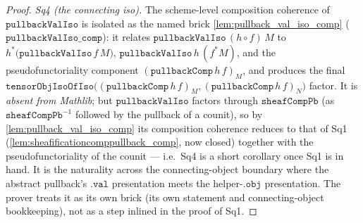 \begin{proof}
  \emph{Sq4 (the connecting iso).} The scheme-level composition coherence of
  \(\mathtt{pullbackValIso}\) is isolated as the named brick \cref{lem:pullback_val_iso_comp}
  (\(\mathtt{pullbackValIso\_comp}\)): it relates \(\mathtt{pullbackValIso}\,(h \circ f)\,M\) to
  \(h^{*}\bigl(\mathtt{pullbackValIso}\,f\,M\bigr)\),
  \(\mathtt{pullbackValIso}\,h\,(f^{*}M)\), and the pseudofunctoriality component
  \((\mathtt{pullbackComp}\,h\,f)_M\), and produces the final
  \(\mathtt{tensorObjIsoOfIso}\bigl((\mathtt{pullbackComp}\,h\,f)_M,
  (\mathtt{pullbackComp}\,h\,f)_N\bigr)\) factor. It is \emph{absent from Mathlib}; but
  \(\mathtt{pullbackValIso}\) factors through \(\mathtt{sheafCompPb}\) (as
  \(\mathtt{sheafCompPb}^{-1}\) followed by the pullback of a counit), so by
  \cref{lem:pullback_val_iso_comp} its composition coherence reduces to that of Sq1
  (\cref{lem:sheafificationcomppullback_comp}, now closed) together with the
  pseudofunctoriality of the counit --- i.e.\ Sq4 is a short corollary once Sq1 is in hand. It
  is the naturality across the connecting-object boundary where the abstract pullback's
  \(\mathtt{.val}\) presentation meets the helper-\(\mathtt{.obj}\) presentation. The prover
  treats it as its own brick (its own statement and connecting-object bookkeeping), not as a
  step inlined in the proof of Sq1.


\end{proof}
